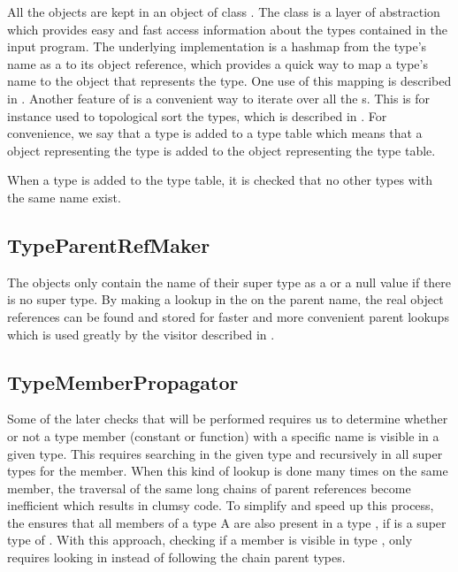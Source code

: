 All the  objects are kept in an object of class
. The  class is a layer of abstraction
which provides easy and fast access information about the types contained in the
input program. The underlying implementation is a hashmap from the type's name
as a  to its object reference, which provides a quick way to map a type's name
to the  object that represents the type. One use of this mapping is 
described in . Another feature of  is a 
convenient way to iterate over all the s. This is for instance used
to topological sort the types, which is described in .
For convenience, we say that a type is added to a type table which means that a
 object representing the type is added to the
 object representing the type table.

When a type is added to the type table, it is checked that no other types with
the same name exist.

\subsection{TypeParentRefMaker}
\label{sec:TypeParentRefMaker}
The  objects only contain the name of their super type
as a  or a null value if there is no super type. By making a
lookup in the  on the parent name, the real object
references can be found and stored for faster and more convenient parent lookups
which is used greatly by the visitor described in
.

\subsection{TypeMemberPropagator}
\label{sec:TypeMemberPropagator}
Some of the later checks that will be performed requires us to determine whether
or not a type member (constant or function) with a specific name is visible in a
given type. This requires searching in the given type and recursively in all
super types for the member. When this kind of lookup is done many times on the
same member, the traversal of the same long chains of parent references become
inefficient which results in clumsy code. To simplify and speed up this process,
the  ensures that all members of a type A are
also present in a type , if  is a super type of . With
this approach, checking if a member is visible in type , only requires
looking in  instead of following the chain parent types.


